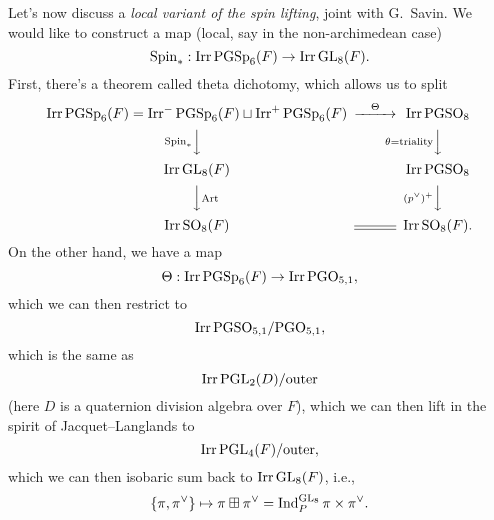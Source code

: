 \documentclass[reqno]{amsart} 
\begin{document}
Let's now discuss a \emph{local variant of the spin lifting}, joint with G.\ Savin.  We would like to construct a map (local, say in the non-archimedean case)
\begin{equation*}
  \operatorname{Spin} _\ast : \operatorname{Irr} \operatorname{PGSp}_6 (F) \rightarrow \operatorname{Irr} \operatorname{GL}_8 (F).
\end{equation*}
First, there's a theorem called theta dichotomy, which allows us to split
\begin{equation*}
  \begin{CD}         
    \Irr \PGSp_6 (F) = \Irr^- \PGSp_6 (F)
    \sqcup \Irr^+  \PGSp_6 (F)   @> \Theta >> \Irr \mathrm{PGSO}_8 \\
    @V \Spin _\ast VV  @V \theta = \mathrm{triality} VV \\
    \Irr \GL_8 (F) @. \Irr \mathrm{PGSO}_8 \\
    @VV \mathrm{Art} V  @V (p^\vee )^+  VV \\
    \Irr \SO_8 (F) @= \Irr \SO_8 (F). \\
  \end{CD}
\end{equation*}
On the other hand, we have a map
\begin{equation*}
  \Theta : \operatorname{Irr} \operatorname{PGSp}_6(F) \rightarrow \operatorname{Irr} \mathrm{PGO}_{5,1},
\end{equation*}
which we can then restrict to
\begin{equation*}
  \operatorname{Irr} \mathrm{PGSO}_{5, 1} / \mathrm{PGO}_{5,1},
\end{equation*}
which is the same as
\begin{equation*}
  \operatorname{Irr} \operatorname{PGL}_2(D) / \mathrm{outer}
\end{equation*}
(here $D$ is a quaternion division algebra over $F$), which we can then lift in the spirit of Jacquet--Langlands to
\begin{equation*}
  \operatorname{Irr} \operatorname{PGL}_4 (F) / \mathrm{outer},
\end{equation*}
which we can then isobaric sum back to $\operatorname{Irr} \operatorname{GL}_8(F)$, i.e.,
\begin{equation*}
  \{\pi, \pi^\vee \} \mapsto \pi \boxplus \pi^\vee = \operatorname{Ind}_P^{\operatorname{GL}_8 } \pi \times \pi^\vee.
\end{equation*}
\end{document}
